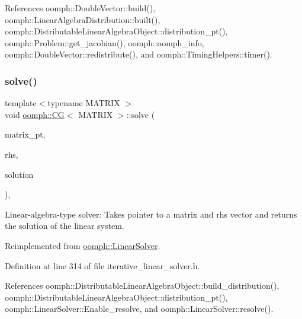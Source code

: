 References oomph\+::\+Double\+Vector\+::build(), oomph\+::\+Linear\+Algebra\+Distribution\+::built(), oomph\+::\+Distributable\+Linear\+Algebra\+Object\+::distribution\+\_\+pt(), oomph\+::\+Problem\+::get\+\_\+jacobian(), oomph\+::oomph\+\_\+info, oomph\+::\+Double\+Vector\+::redistribute(), and oomph\+::\+Timing\+Helpers\+::timer().

\mbox{\label{classoomph_1_1CG_a764dbdc8e63d9dfe0945015399a83c18}} 
\subsubsection{\texorpdfstring{solve()}{solve()}\hspace{0.1cm}{\footnotesize\ttfamily [2/2]}}
{\footnotesize\ttfamily template$<$typename M\+A\+T\+R\+IX $>$ \\
void \hyperlink{classoomph_1_1CG}{oomph\+::\+CG}$<$ M\+A\+T\+R\+IX $>$\+::solve (\begin{DoxyParamCaption}\item[{\hyperlink{classoomph_1_1DoubleMatrixBase}{Double\+Matrix\+Base} $\ast$const \&}]{matrix\+\_\+pt,  }\item[{const \hyperlink{classoomph_1_1DoubleVector}{Double\+Vector} \&}]{rhs,  }\item[{\hyperlink{classoomph_1_1DoubleVector}{Double\+Vector} \&}]{solution }\end{DoxyParamCaption})\hspace{0.3cm}{\ttfamily [inline]}, {\ttfamily [virtual]}}



Linear-\/algebra-\/type solver\+: Takes pointer to a matrix and rhs vector and returns the solution of the linear system. 



Reimplemented from \hyperlink{classoomph_1_1LinearSolver_a546c09822d18191df14caed864c04c09}{oomph\+::\+Linear\+Solver}.



Definition at line 314 of file iterative\+\_\+linear\+\_\+solver.\+h.



References oomph\+::\+Distributable\+Linear\+Algebra\+Object\+::build\+\_\+distribution(), oomph\+::\+Distributable\+Linear\+Algebra\+Object\+::distribution\+\_\+pt(), oomph\+::\+Linear\+Solver\+::\+Enable\+\_\+resolve, and oomph\+::\+Linear\+Solver\+::resolve().

